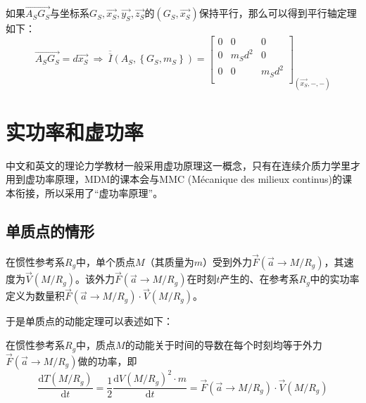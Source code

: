 \documentclass[UTF8]{ctexart}%
\begin{document}
如果$\overrightarrow{A_SG_S}$与坐标系$G_S,\overrightarrow{x_S},\overrightarrow{y_S},\overrightarrow{z_S}$的$\left(G_S,\overrightarrow{x_S}\right)$保持平行，那么可以得到平行轴定理如下：
\begin{equation}
\overrightarrow{A_SG_S}=d\overrightarrow{x_S}\ \Longrightarrow \ \overline{\overline{I}}\left( A_S,\left\{ G_S,m_S \right\} \right) =\left[ \begin{matrix}
	0&		0&		0\\
	0&		m_Sd^2&		0\\
	0&		0&		m_Sd^2\\
\end{matrix} \right] _{\left( \overrightarrow{x_S},-,- \right)}
\end{equation}


\section{实功率和虚功率}
\label{sec:实功率和虚功率}

中文和英文的理论力学教材一般采用虚功原理这一概念，只有在连续介质力学里才用到虚功率原理，MDM的课本会与MMC (Mécanique des milieux continus)的课本衔接，所以采用了“虚功率原理”。



\subsection{单质点的情形}
\label{sec:单质点的情形}
在惯性参考系$R_g$中，单个质点$M$（其质量为$m$）受到外力$\overrightarrow{F}\left(\overrightarrow{a}\rightarrow M/R_g\right)$，其速度为$\overrightarrow{V}\left(M/R_g\right)$。该外力$\overrightarrow{F}\left(\overrightarrow{a}\rightarrow M/R_g\right)$在时刻$t$产生的、在参考系$R_g$中的实功率定义为数量积$\overrightarrow{F}\left(\overrightarrow{a}\rightarrow M/R_g\right)\cdot \overrightarrow{V}\left(M/R_g\right)$。

于是单质点的动能定理可以表述如下：

在惯性参考系$R_g$中，质点$M$的动能关于时间的导数在每个时刻均等于外力$\overrightarrow{F}\left(\overrightarrow{a}\rightarrow M/R_g\right)$做的功率，即
\begin{equation}
\frac{\mathrm{d}T\left(M/R_g\right)}{\mathrm{d}t}=\frac{1}{2}\frac{\mathrm{d}V\left(M/R_g\right)^2\cdot m}{\mathrm{d}t}=\overrightarrow{F}\left(\overrightarrow{a}\rightarrow M/R_g\right)\cdot \overrightarrow{V}\left(M/R_g\right)
\end{equation}
\end{document}
